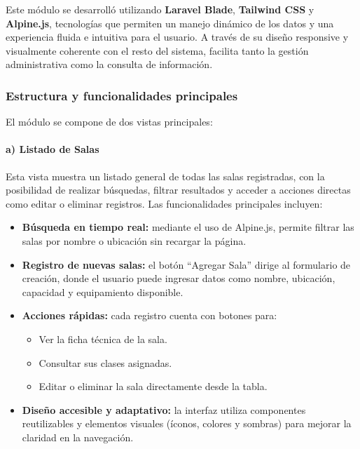 Este módulo se desarrolló utilizando \textbf{Laravel Blade}, \textbf{Tailwind CSS} y \textbf{Alpine.js}, tecnologías que permiten un manejo dinámico de los datos y una experiencia fluida e intuitiva para el usuario. A través de su diseño responsive y visualmente coherente con el resto del sistema, facilita tanto la gestión administrativa como la consulta de información.

\subsubsection{Estructura y funcionalidades principales}

El módulo se compone de dos vistas principales:

\paragraph{a) Listado de Salas}

Esta vista muestra un listado general de todas las salas registradas, con la posibilidad de realizar búsquedas, filtrar resultados y acceder a acciones directas como editar o eliminar registros. Las funcionalidades principales incluyen:

\begin{itemize}
    \item \textbf{Búsqueda en tiempo real:} mediante el uso de Alpine.js, permite filtrar las salas por nombre o ubicación sin recargar la página.
    
    \item \textbf{Registro de nuevas salas:} el botón ``Agregar Sala'' dirige al formulario de creación, donde el usuario puede ingresar datos como nombre, ubicación, capacidad y equipamiento disponible.
    
    \item \textbf{Acciones rápidas:} cada registro cuenta con botones para:
    \begin{itemize}
        \item Ver la ficha técnica de la sala.
        \item Consultar sus clases asignadas.
        \item Editar o eliminar la sala directamente desde la tabla.
    \end{itemize}
    
    \item \textbf{Diseño accesible y adaptativo:} la interfaz utiliza componentes reutilizables y elementos visuales (íconos, colores y sombras) para mejorar la claridad en la navegación.
\end{itemize}

